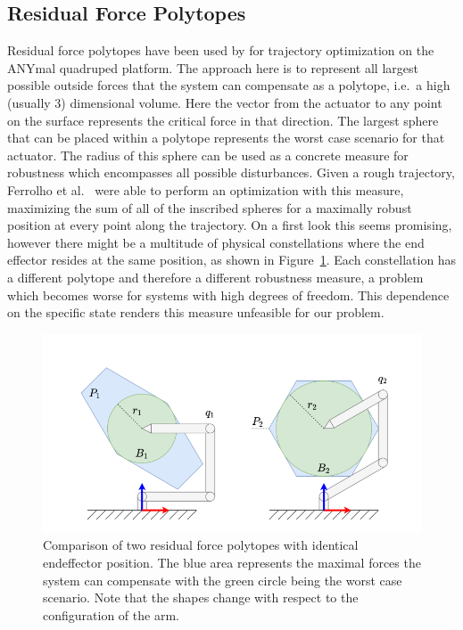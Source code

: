 \subsection{Residual Force Polytopes} \label{Residual Force Polytopes}
Residual force polytopes have been used by \cite{respoly} for trajectory optimization on the ANYmal quadruped platform. The approach here is to represent all largest possible outside forces that the system can compensate as a polytope, i.e.\ a high (usually 3) dimensional volume. Here the vector from the actuator to any point on the surface represents the critical force in that direction. The largest sphere that can be placed within a polytope represents the worst case scenario for that actuator. The radius of this sphere can be used as a concrete measure for robustness which encompasses all possible disturbances. Given a rough trajectory, Ferrolho et al.\ \cite{anytraj} were able to perform an optimization with this measure, maximizing the sum of all of the inscribed spheres for a maximally robust position at every point along the trajectory. 
On a first look this seems promising, however there might be a multitude of physical constellations where the end effector resides at the same position, as shown in Figure~\ref{fig:resforce}. Each constellation has a different polytope and therefore a different robustness measure, a problem which becomes worse for systems with high degrees of freedom. This dependence on the specific state renders this measure unfeasible for our problem.
\begin{figure}[ht]
    \centering
    \includegraphics[width=\linewidth]{figures/resdidual_force_polytope}
    \caption{Comparison of two residual force polytopes with identical endeffector position. The blue area represents the maximal forces the system can compensate with the green circle being the worst case scenario. Note that the shapes change with respect to the configuration of the arm.\cite{respoly}}
    \label{fig:resforce}
\end{figure}


